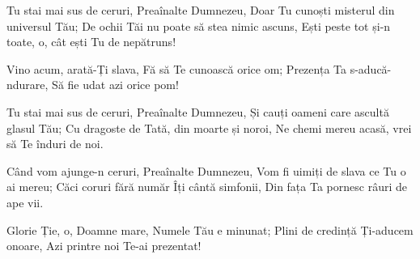 \beginverse
Tu stai mai sus de ceruri, Preaînalte Dumnezeu,
Doar Tu cunoști misterul din universul Tău;
De ochii Tăi nu poate să stea nimic ascuns,
Ești peste tot și-n toate, o, cât ești Tu de nepătruns!
\endverse

\beginchorus
Vino acum, arată-Ți slava,
Fă să Te cunoască orice om;
Prezența Ta s-aducă-ndurare,
Să fie udat azi orice pom!
\endchorus

\beginverse
Tu stai mai sus de ceruri, Preaînalte Dumnezeu,
Și cauți oameni care ascultă glasul Tău;
Cu dragoste de Tată, din moarte și noroi,
Ne chemi mereu acasă, vrei să Te înduri de noi.
\endverse

\beginverse
Când vom ajunge-n ceruri, Preaînalte Dumnezeu,
Vom fi uimiți de slava ce Tu o ai mereu;
Căci coruri fără număr Îți cântă simfonii,
Din fața Ta pornesc râuri de ape vii.
\endverse

\beginchorus
Glorie Ție, o, Doamne mare,
Numele Tău e minunat;
Plini de credință Ți-aducem onoare,
Azi printre noi Te-ai prezentat!
\endchorus
\endsong